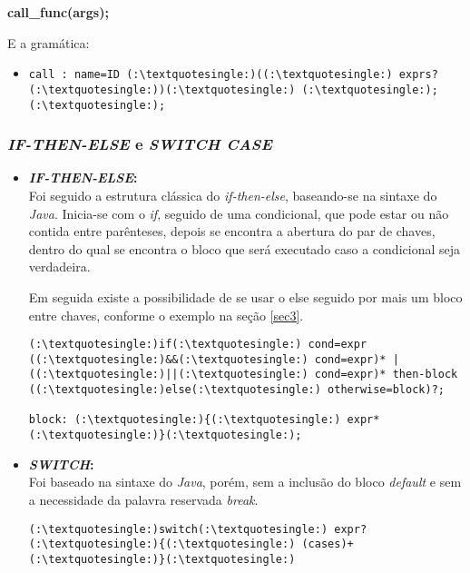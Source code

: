 \begin{itemize}
            \textbf{call\_func(args);}

            E a gramática:
			\begin{itemize}
				\item[ ]
				
    			   \begin{lstlisting}
call : name=ID (:\textquotesingle:)((:\textquotesingle:) exprs? (:\textquotesingle:))(:\textquotesingle:) (:\textquotesingle:);(:\textquotesingle:);            
	           \end{lstlisting}

			\end{itemize}
			
		\subsubsection{\normalsize \textit{IF-THEN-ELSE} e \textit{SWITCH CASE}}
        
        		\begin{itemize}
        			\item \textbf{\textit{IF-THEN-ELSE}:}\\
        				Foi seguido a estrutura clássica do \textit{if-then-else}, baseando-se na sintaxe do \textit{Java}. Inicia-se com o \textit{if}, seguido de uma condicional, que pode estar ou não contida entre parênteses, depois se encontra a abertura do par de chaves, dentro do qual se encontra o bloco que será executado caso a condicional seja verdadeira.
        				
        				Em seguida existe a possibilidade de se usar o else seguido por mais um bloco entre chaves, conforme o exemplo na seção \ref{sec3}.
        			
					\begin{lstlisting}
(:\textquotesingle:)if(:\textquotesingle:) cond=expr ((:\textquotesingle:)&&(:\textquotesingle:) cond=expr)* | ((:\textquotesingle:)||(:\textquotesingle:) cond=expr)* then-block ((:\textquotesingle:)else(:\textquotesingle:) otherwise=block)?;

block: (:\textquotesingle:){(:\textquotesingle:) expr* (:\textquotesingle:)}(:\textquotesingle:);
        				\end{lstlisting}
        			
        			\item \textbf{\textit{SWITCH}:}\\
        				Foi baseado na sintaxe do \textit{Java}, porém, sem a inclusão do bloco \textit{default} e sem a necessidade da palavra reservada \textit{break}.
        				\begin{lstlisting}
(:\textquotesingle:)switch(:\textquotesingle:) expr? (:\textquotesingle:){(:\textquotesingle:) (cases)+ (:\textquotesingle:)}(:\textquotesingle:)


\end{lstlisting}
\end{itemize}
\end{itemize}
